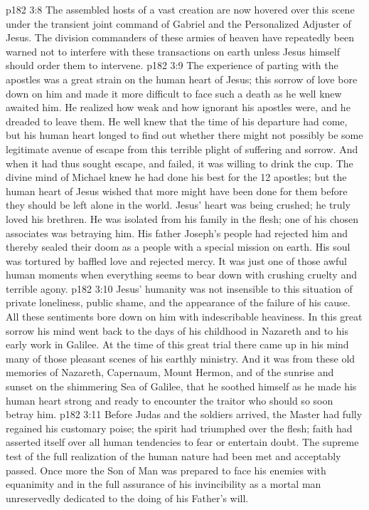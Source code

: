 \vs p182 3:8 The assembled hosts of a vast creation are now hovered over this scene under the transient joint command of Gabriel and the Personalized Adjuster of Jesus. The division commanders of these armies of heaven have repeatedly been warned not to interfere with these transactions on earth unless Jesus himself should order them to intervene.
\vs p182 3:9 \pc The experience of parting with the apostles was a great strain on the human heart of Jesus; this sorrow of love bore down on him and made it more difficult to face such a death as he well knew awaited him. He realized how weak and how ignorant his apostles were, and he dreaded to leave them. He well knew that the time of his departure had come, but his human heart longed to find out whether there might not possibly be some legitimate avenue of escape from this terrible plight of suffering and sorrow. And when it had thus sought escape, and failed, it was willing to drink the cup. The divine mind of Michael knew he had done his best for the 12 apostles; but the human heart of Jesus wished that more might have been done for them before they should be left alone in the world. Jesus’ heart was being crushed; he truly loved his brethren. He was isolated from his family in the flesh; one of his chosen associates was betraying him. His father Joseph’s people had rejected him and thereby sealed their doom as a people with a special mission on earth. His soul was tortured by baffled love and rejected mercy. It was just one of those awful human moments when everything seems to bear down with crushing cruelty and terrible agony.
\vs p182 3:10 Jesus’ humanity was not insensible to this situation of private loneliness, public shame, and the appearance of the failure of his cause. All these sentiments bore down on him with indescribable heaviness. In this great sorrow his mind went back to the days of his childhood in Nazareth and to his early work in Galilee. At the time of this great trial there came up in his mind many of those pleasant scenes of his earthly ministry. And it was from these old memories of Nazareth, Capernaum, Mount Hermon, and of the sunrise and sunset on the shimmering Sea of Galilee, that he soothed himself as he made his human heart strong and ready to encounter the traitor who should so soon betray him.
\vs p182 3:11 Before Judas and the soldiers arrived, the Master had fully regained his customary poise; the spirit had triumphed over the flesh; faith had asserted itself over all human tendencies to fear or entertain doubt. The supreme test of the full realization of the human nature had been met and acceptably passed. Once more the Son of Man was prepared to face his enemies with equanimity and in the full assurance of his invincibility as a mortal man unreservedly dedicated to the doing of his Father’s will.
\quizlink
